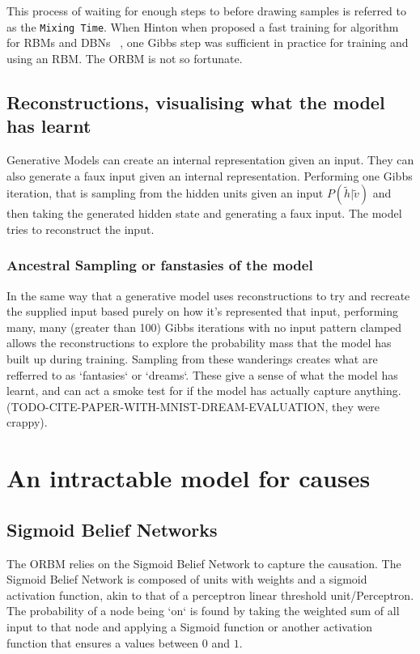 This process of waiting for enough steps to before drawing samples is referred to as the \texttt{Mixing Time}. When Hinton when proposed a fast training for algorithm for RBMs and DBNs ~\cite{Hinton:2006:FLA:1161603.1161605}, one Gibbs step was sufficient in practice for training and using an RBM. The ORBM is not so fortunate.


\subsection{Reconstructions, visualising what the model has learnt}

Generative Models can create an internal representation given an input. They can also generate a faux input given an internal representation. Performing one Gibbs iteration, that is sampling from the hidden units given an input $ P(\tilde{h}|\tilde{v}) $ and then taking the generated hidden state and generating a faux input. The model tries to reconstruct the input.

  \subsubsection{Ancestral Sampling or fanstasies of the model}
  \todo%
  In the same way that a generative model uses reconstructions to try and recreate the  supplied input based purely on how it's represented that input, performing many, many (greater than 100) Gibbs iterations with no input pattern clamped allows the reconstructions to explore the probability mass that the model has built up during training. Sampling from these wanderings creates what are refferred to as `fantasies` or `dreams`. These give a sense of what the model has learnt, and can act a smoke test for if the model has actually capture anything.
  (TODO-CITE-PAPER-WITH-MNIST-DREAM-EVALUATION, they were crappy).

  \section{An intractable model for causes}
    \subsection{Sigmoid Belief Networks}
    \todo%

    The ORBM relies on the Sigmoid Belief Network to capture the causation. The Sigmoid Belief Network is composed of units with weights and a sigmoid activation function, akin to that of a perceptron linear threshold unit/Perceptron. The probability of a node being `on` is found by taking the weighted sum of all input to that node and applying a Sigmoid function or another activation function that ensures a values between $0$ and $1$.

